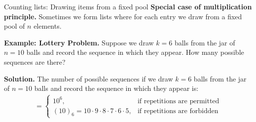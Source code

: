 \documentclass[dvipsnames, 10pt]{beamer}
\begin{document}
\begin{frame}{Counting lists: Drawing items from a fixed pool}
\small 
\colorbox{red!30}{\textbf{Special case of multiplication principle.}} Sometimes we form lists where for each entry we draw from a fixed pool of $n$ elements. 

\pause \vfill 	

\colorbox{yellow!30}{\textbf{Example: Lottery Problem.}} Suppose we draw $k=6$ balls from the jar of $n=10$ balls and record the sequence in which they appear. How many possible sequences are there?

\begin{center}
\end{center}

\pause 
\colorbox{green!30}{\textbf{Solution.}} The number of possible sequences if we draw $k=6$ balls from the jar of $n=10$ balls and record the sequence in which they appear is:
%
\begin{align*}
= \begin{cases}
 10^6, & \text{if repetitions are permitted} \\
 (10)_6 = 10 \cdot 9 \cdot 8 \cdot 7 \cdot 6 \cdot 5, & \text{if repetitions are forbidden}	
 \end{cases}
\end{align*}

\end{frame}
\end{document}
